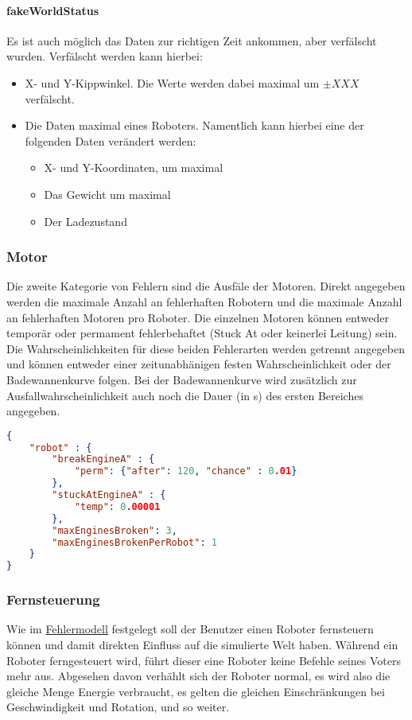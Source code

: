 \paragraph{fakeWorldStatus} Es ist auch m{\"{o}}glich das Daten zur richtigen Zeit ankommen, aber
    verf{\"{a}}lscht wurden. Verf{\"{a}}lscht werden kann hierbei:
	\begin{itemize}
		\item X- und Y-Kippwinkel. Die Werte werden dabei maximal um $\pm XXX$ verf{\"{a}}lscht.
		\item Die Daten maximal eines Roboters. Namentlich kann hierbei eine der folgenden Daten
			ver{\"{a}}ndert werden:
			\begin{itemize}
				\item X- und Y-Koordinaten, um maximal
				\item Das Gewicht um maximal
				\item Der Ladezustand
			\end{itemize}
	\end{itemize}

\subsubsection{Motor}
Die zweite Kategorie von Fehlern sind die Ausf{\"{a}}le der Motoren. Direkt angegeben werden die maximale Anzahl an fehlerhaften Robotern und die maximale
Anzahl an fehlerhaften Motoren pro Roboter. Die einzelnen Motoren k{\"{o}}nnen entweder tempor{\"{a}}r oder permament fehlerbehaftet (Stuck At oder keinerlei Leitung) sein.
Die Wahrscheinlichkeiten f{\"{u}}r diese beiden Fehlerarten werden getrennt angegeben und k{\"{o}}nnen entweder einer zeitunabh{\"{a}}nigen festen Wahrscheinlichkeit oder
der Badewannenkurve folgen. Bei der Badewannenkurve wird zus{\"{a}}tzlich zur Ausfallwahrscheinlichkeit auch noch die Dauer (in s) des ersten Bereiches angegeben.
\begin{lstlisting}[frame=single, language=json] 
{
	"robot" : {
		"breakEngineA" : {
			"perm": {"after": 120, "chance" : 0.01}
		},
		"stuckAtEngineA" : {
			"temp": 0.00001
		},
		"maxEnginesBroken": 3,
		"maxEnginesBrokenPerRobot": 1
	}
}
\end{lstlisting}


\subsubsection{Fernsteuerung}
Wie im \hyperref[fm]{Fehlermodell} festgelegt soll der Benutzer einen Roboter fernsteuern k{\"{o}}nnen und damit direkten Einfluss auf die simulierte Welt haben. W{\"{a}}hrend ein Roboter
ferngesteuert wird, f{\"{u}}hrt dieser eine Roboter keine Befehle seines Voters mehr aus. Abgesehen davon verh{\"{a}}hlt sich der Roboter normal, es wird also die gleiche Menge Energie verbraucht,
es gelten die gleichen Einschr{\"{a}}nkungen bei Geschwindigkeit und Rotation, und so weiter.

